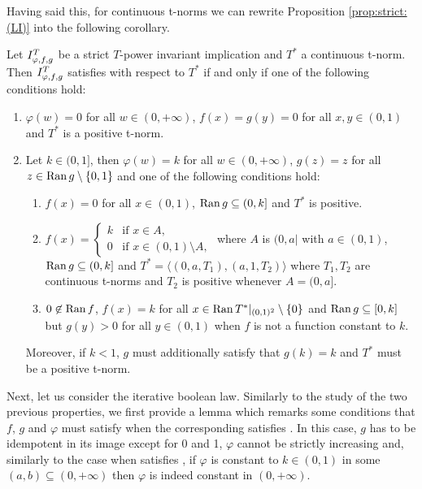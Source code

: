 Having said this,  for continuous t-norms we can rewrite Proposition \ref{prop:strict:(LI)} into the following corollary.
\begin{corollary}\label{cor:(LI)Tcont} Let $I^T_{\varphi,f,g}$ be a strict $T$-power invariant implication and $T^*$ a continuous t-norm. Then $I^T_{\varphi,f,g}$ satisfies \LI with respect to $T^*$ if and only if one of the following conditions hold:
	\begin{enumerate}[label=(\roman*)]
		\item $\varphi(w)=0$ for all $w \in (0,+\infty)$, $f(x)=g(y)=0$ for all $x,y \in (0,1)$ and $T^*$ is a positive t-norm.
		\item  Let $k \in (0,1]$, then $\varphi(w)=k$ for all $w \in (0,+\infty)$, $g(z)=z$ for all $z \in \operatorname{Ran} g \setminus \{0,1\}$ and one of the following conditions hold:
		\begin{enumerate}
			\item $f(x)=0$ for all $x \in (0,1)$, $\operatorname{Ran} g \subseteq (0,k]$ and $T^*$ is positive.
			\item $f(x)=\left\{ \begin{array}{ll}
				k &   \text{if }   x \in A, \\
				0 &  \text{if }   x \in (0,1)\setminus A,	\end{array}
			\right.$ where $A$ is $(0,a|$ with $ a \in (0,1)$, $\operatorname{Ran} g \subseteq (0,k]$ and $T^*=\langle (0,a,T_1),(a,1,T_2) \rangle$ where $T_1,T_2$ are continuous t-norms and $T_2$ is positive whenever $A=(0,a]$.
			\item $0 \not \in \operatorname{Ran} f$, $f(x)=k$ for all $x \in \operatorname{Ran} T^*|_{(0,1)^2} \setminus \{0\}$ and $\operatorname{Ran} g \subseteq [0,k]$ but $g(y) > 0$ for all $y \in (0,1)$ when $f$ is not a function constant to $k$.
		\end{enumerate}
		Moreover, if $k < 1$, $g$ must additionally satisfy that $g(k)=k$ and $T^*$ must be a positive t-norm.
	\end{enumerate}
\end{corollary}
Next, let us consider the iterative boolean law. Similarly to the study of the two previous properties, we first provide a lemma which remarks some conditions that $f$, $g$ and $\varphi$ must satisfy when the corresponding \STP satisfies \IB. In this case, $g$ has to be idempotent in its image except for 0 and 1, $\varphi$ cannot be strictly increasing and, similarly to the case when \IT satisfies \EP, if $\varphi$ is constant to $k\in(0,1)$ in some $(a,b) \subseteq (0,+\infty)$ then $\varphi$ is indeed constant in $(0,+\infty)$.
